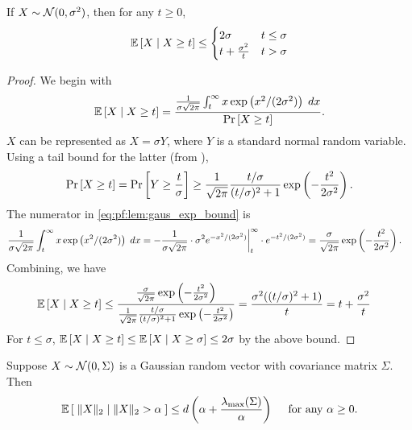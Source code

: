 \begin{lemma}
  If $X \sim \mathcal{N}(0, \sigma^2)$, then for any $t \ge 0$,
  \[
    \mathbb{E}\left[X \;|\; X \ge t\right] \le \begin{cases}
      2 \sigma & t \le \sigma \\
      t + \frac{\sigma^2}{t} & t > \sigma
    \end{cases}
  \]
  \label{lem:gaus_exp_bound}
\end{lemma}
\begin{proof}
  We begin with
  \begin{align}\label{eq:pf:lem:gaus_exp_bound}
    \mathbb{E}\left[X \;|\; X \ge t\right] = \frac{\frac{1}{\sigma\sqrt{2\pi}}\int_t^\infty x
    \exp\left(x^2/(2\sigma^2)\right) \;dx}{\Pr\left[X \ge t\right]}.
  \end{align}
$X$ can be represented as $X = \sigma Y$, where $Y$ is a standard normal random variable. Using a tail bound for the latter (from \citet{cook2009upper}),
\[
    \Pr\left[X \ge t\right] = \Pr\left[Y \ge \frac{t}{\sigma}\right] \ge
    \frac{1}{\sqrt{2\pi}} \frac{t/\sigma}{(t/\sigma)^2 + 1}
    \exp\left(-\frac{t^2}{2\sigma^2}\right).
  \]
  The numerator in \eqref{eq:pf:lem:gaus_exp_bound} is
  \begin{align*}
    \frac{1}{\sigma\sqrt{2\pi}}\int_t^\infty x \exp\left(x^2/(2\sigma^2)\right) \;dx
    &= -\frac{1}{\sigma \sqrt{2\pi}} \cdot \sigma^2 e^{-x^2/(2\sigma^2)}
    \bigg|_t^\infty \cdot e^{-t^2/(2\sigma^2)}
    = \frac{\sigma}{\sqrt{2\pi}} \exp\left(-\frac{t^2}{2\sigma^2}\right).
  \end{align*}
  Combining, we have
  \begin{align*}
    \mathbb{E}\left[X \;|\; X \ge t\right] &\le \frac{\frac{\sigma}{\sqrt{2\pi}}
    \exp\left(-\frac{t^2}{2\sigma^2}\right)}{\frac{1}{\sqrt{2\pi}}\frac{t/\sigma}{(t/\sigma)^2
    + 1} \exp\left(-\frac{t^2}{2\sigma^2}\right)}
    = \frac{\sigma^2 ((t/\sigma)^2 + 1)}{t}
    = t + \frac{\sigma^2}{t}
  \end{align*}
  For $t \le \sigma$, $\mathbb{E}\left[X \;|\; X \ge t\right] \le \mathbb{E}\left[X \;|\; X \ge \sigma\right] \le
  2\sigma$ by the above bound.
\end{proof}
\begin{lemma}
 Suppose $X \sim \mathcal{N}(0, \Sigma)$ is a Gaussian random vector with covariance matrix $\Sigma$. Then
  \[
    \mathbb{E}\left[\; \|X\|_2 \;|\; \|X\|_2 > \alpha \;\right] 
        \le d\left(\alpha+ \frac{\lambda_{\max}(\Sigma)}{\alpha}\right) \quad\
    \text{for any $\alpha \ge 0$}.
  \]
  \label{lem:gaus_exp_norm_bound}
\end{lemma}
